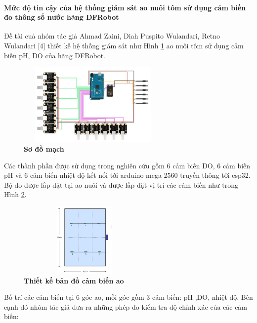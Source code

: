 \documentclass{article} %
\begin{document}
	\paragraph{Mức độ tin cậy của hệ thống giám sát ao nuôi tôm sử dụng cảm biến đo thông số nước hãng DFRobot}\mbox{}
	
	Đề tài cuả nhóm tác giả Ahmad Zaini, Diah Puspito Wulandari, Retno Wulandari [4]  thiết kế hệ thống giám sát như Hình \ref{sodomach} ao nuôi tôm sử dụng cảm biến pH, DO của hãng DFRobot. 
	
	\begin{figure}[!ht]
		\centering
		\includegraphics[width=7.4cm,height=4cm]{Images/sodomach.png}
		\caption[ Sơ đồ mạch \cite{zaini2020data}]{\bfseries \fontsize{12pt}{0pt}\selectfont Sơ đồ mạch \cite{zaini2020data}}
		\label{sodomach}
	\end{figure}
	
	Các thành phần được sử dụng trong nghiên cứu gồm 6 cảm biến DO, 6 cảm biến pH và 6 cảm biến nhiệt độ kết nối tới arduino mega 2560 truyền thông tới esp32. Bộ đo được lắp đặt tại ao nuôi và được lắp đặt vị trí các cảm biến như trong Hình \ref{bandoao}.
	
	\begin{figure}[!ht]
		\centering
		\includegraphics[width=6.5cm,height=3.6cm]{Images/bandoao.png}
		\caption[Thiết kế bản đồ cảm biến ao\cite{zaini2020data}]{\bfseries \fontsize{12pt}{0pt}\selectfont Thiết kế bản đồ cảm biến ao \cite{zaini2020data}}
		\label{bandoao}
	\end{figure}
	

	Bố trí các cảm biến tại 6 góc ao, mỗi góc gồm 3 cảm biến: pH ,DO, nhiệt độ.
	Bên cạnh đó nhóm tác giả đưa ra những phép đo kiểm tra độ chính xác của các cảm biến:
	
\end{document}
